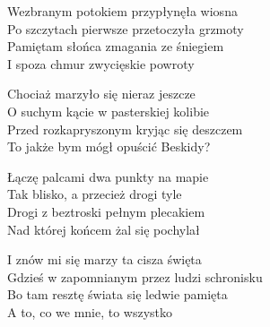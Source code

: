 \begin{text}
Wezbranym potokiem przypłynęła wiosna\\
Po szczytach pierwsze przetoczyła grzmoty\\
Pamiętam słońca zmagania ze śniegiem\\
I spoza chmur zwycięskie powroty

Chociaż marzyło się nieraz jeszcze\\
O suchym kącie w pasterskiej kolibie\\
Przed rozkapryszonym kryjąc się deszczem\\
To jakże bym mógł opuścić Beskidy?

Łączę palcami dwa punkty na mapie\\
Tak blisko, a przecież drogi tyle\\
Drogi z beztroski pełnym plecakiem\\
Nad której końcem żal się pochylał

I znów mi się marzy ta cisza święta\\
Gdzieś w zapomnianym przez ludzi schronisku\\
Bo tam resztę świata się ledwie pamięta\\
A to, co we mnie, to wszystko
\end{text}